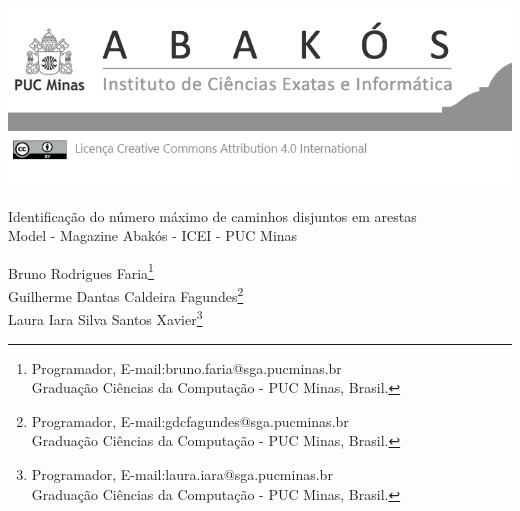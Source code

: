 \documentclass[a4paper,12pt,Times]{article}
\makeatletter
\newcommand{\monog}{Identificação do número  máximo  de  caminhos  disjuntos  em  arestas}
\newcommand{\monogES}{Model - Magazine Abakós - ICEI - PUC Minas}
\newcommand{\origem}{Brasil}
\newcommand{\AutorA}{Bruno Rodrigues Faria}
\newcommand{\funcaoA}{Programador}
\newcommand{\emailA}{bruno.faria@sga.pucminas.br}
\newcommand{\cursA}{Graduação Ciências da Computação - PUC Minas}
\newcommand{\AutorB}{Guilherme Dantas Caldeira Fagundes}
\newcommand{\funcaoB}{Programador}
\newcommand{\emailB}{gdcfagundes@sga.pucminas.br}
\newcommand{\cursB}{Graduação Ciências da Computação - PUC Minas}
\newcommand{\AutorC}{Laura Iara Silva Santos Xavier}
\newcommand{\funcaoC}{Programador}
\newcommand{\emailC}{laura.iara@sga.pucminas.br}
\newcommand{\cursC}{Graduação Ciências da Computação - PUC Minas}
\newcommand{\keyword}[1]{\textsf{#1}}
\makeatother
\begin{document}

\begin{flushleft}

\begin{minipage} [c][5cm][b]{16.5cm}
\includegraphics[scale=1.1]{figuras/pucmg.png} 
\end{minipage}

 \vspace{0cm} {
 \singlespacing \Large{\monog {} \\ }
  \normalsize{\monogES}
 }
\end{flushleft}
\begin{flushright}
\singlespacing 
\normalsize{\AutorA \footnote{\funcaoA, E-mail:\emailA \\ \cursA, \origem. }} \\
\normalsize{\AutorB \footnote{\funcaoB, E-mail:\emailB \\ \cursB, \origem. }} \\
\normalsize{\AutorC \footnote{\funcaoC, E-mail:\emailC \\ \cursC, \origem. }} \\
\end{flushright}
\thispagestyle{empty}

\begin{abstract}
\noindent
Há vários problemas a serem tratados com a descoberta do número máximo de caminhos disjuntos em arestas presentes em um grafo. Este trabalho irá tratar de um método que faz a descoberta de quantos e quais são esses caminhos para o usuário com o intuito de auxiliar em futuros desenvolvimentos. Para isso, basta criar um grafo direcionado e selecionar o vértice de origem e destino, pois um caminho deve sair de um lugar e chegar a outro para que assim possa descobrir os caminhos disjuntos. O trabalho foi realizado na linguagem de programação Python e está disponibilizado para todos terem acesso.
\\\textbf{\keyword{Palavras-chave: }}Grafos. Arestas. Busca. Caminhos. Disjuntos. 
\end{abstract}






 \newpage
 \singlespace{
 
 
 }
\end{document}
